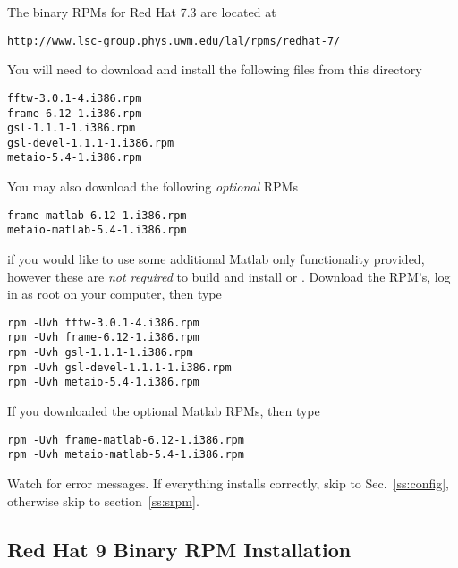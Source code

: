 The binary RPMs for Red Hat 7.3 are located at
\begin{verbatim}
http://www.lsc-group.phys.uwm.edu/lal/rpms/redhat-7/
\end{verbatim}
You will need to download and install the following files from this directory
\begin{verbatim}
fftw-3.0.1-4.i386.rpm
frame-6.12-1.i386.rpm
gsl-1.1.1-1.i386.rpm
gsl-devel-1.1.1-1.i386.rpm
metaio-5.4-1.i386.rpm
\end{verbatim}
You may also download the following \emph{optional} RPMs 
\begin{verbatim}
frame-matlab-6.12-1.i386.rpm
metaio-matlab-5.4-1.i386.rpm
\end{verbatim}
if you would like to use some additional Matlab only functionality provided,
however these are \emph{not required} to build and install \lal or \lalapps.
Download the RPM's, log in as root on your computer, then type
\begin{verbatim}
rpm -Uvh fftw-3.0.1-4.i386.rpm
rpm -Uvh frame-6.12-1.i386.rpm
rpm -Uvh gsl-1.1.1-1.i386.rpm
rpm -Uvh gsl-devel-1.1.1-1.i386.rpm
rpm -Uvh metaio-5.4-1.i386.rpm
\end{verbatim}
If you downloaded the optional Matlab RPMs, then type
\begin{verbatim}
rpm -Uvh frame-matlab-6.12-1.i386.rpm
rpm -Uvh metaio-matlab-5.4-1.i386.rpm
\end{verbatim}
Watch for error messages.  If everything installs correctly,  skip to
Sec.~\ref{ss:config},  otherwise skip to section~\ref{ss:srpm}.

\subsection{Red Hat 9 Binary RPM Installation}
\label{ss:rh9}

